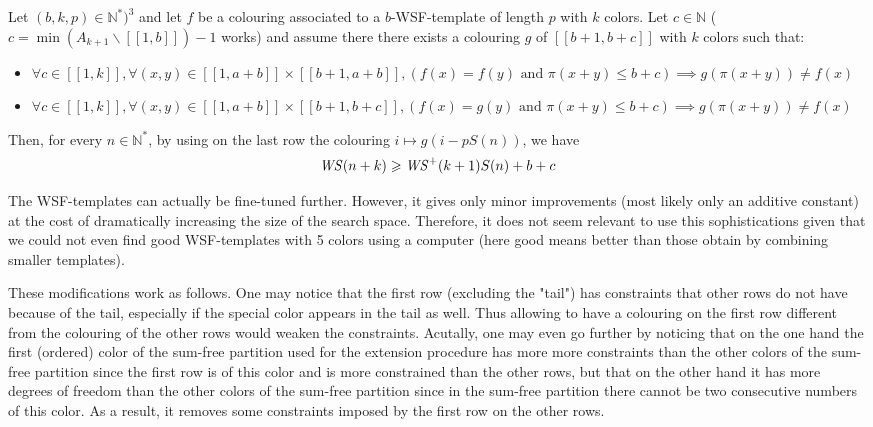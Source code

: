\begin{proposition}
Let \((b, k, p) \in \mathbb{N}^*)^3\) and let \(f\) be a colouring associated to a \(b\)-WSF-template of length \(p\) with \(k\) colors. Let
\(c \in \mathbb{N}\) (\(c = \min (A_{k+1} \backslash [\![1, b ]\!]) - 1\) works) and assume there there exists a colouring \(g\) of
\([\![b + 1, b + c]\!]\) with \(k\) colors such that:

\begin{itemize}
	\item \(\forall c \in [\![1, k]\!], \forall (x, y) \in  [\![1, a + b]\!] \times  [\![b + 1, a + b]\!], (f(x) = f(y) \text{ and } \pi(x + y) \leqslant b + c)
	\implies g(\pi(x + y)) \neq f(x)\)
	\item \(\forall c \in [\![1, k]\!], \forall (x, y) \in  [\![1, a + b]\!] \times  [\![b + 1, b + c]\!],  (f(x) = g(y) \text{ and } \pi(x + y) \leqslant b + c)
\implies g(\pi(x + y)) \neq f(x)\)
\end{itemize}

Then, for every \(n \in \mathbb{N}^*\), by using on the last row the colouring \(i \longmapsto g(i - p S(n))\), we have\\
\[ \mathit{WS}(n+k) \geqslant \mathit{WS}^+(k+1) S(n) + b + c\]
\end{proposition}

The WSF-templates can actually be fine-tuned further. However, it gives only minor improvements (most likely only an additive
constant) at the cost of dramatically increasing the size of the search space. Therefore, it does not seem relevant to
use this sophistications given that we could not even find good WSF-templates with 5 colors using a computer (here good
means better than those obtain by combining smaller templates).

\par These modifications work as follows. One may notice that the first row (excluding the "tail") has constraints that other rows
do not have because of the tail, especially if the special color appears in the tail as well. Thus allowing to have a colouring on the
first row different from the colouring of the other rows would weaken the constraints. Acutally, one may even go further by
noticing that on the one hand the first (ordered) color of the sum-free partition used for the extension procedure has more
more constraints than the other colors of the sum-free partition since the first row is of this color and is more constrained than
the other rows, but that on the other hand it has more degrees of freedom than the other colors of the sum-free partition since in
the sum-free partition there cannot be two consecutive numbers of this color. As a result, it removes  some constraints imposed
 by the first row on the other rows.

